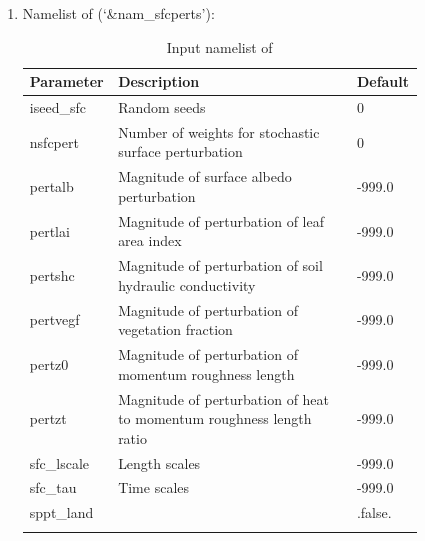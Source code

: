 \documentclass[11pt,fleqn]{report}              %
\begin{document}
\begin{enumerate}
\item Namelist of  (`\&nam\_sfcperts'):
{
\scriptsize
\begin{longtable}{p{0.1\linewidth} | p{0.6\linewidth} | p{0.12\linewidth} }
\hline
\hline
Parameter & Description & Default \\
\hline
iseed\_sfc & Random seeds & 0 \\
 nsfcpert & Number of weights for stochastic surface perturbation & 0 \\
 pertalb & Magnitude of surface albedo perturbation & -999.0 \\
 pertlai & Magnitude of perturbation of leaf area index & -999.0 \\
 pertshc & Magnitude of perturbation of soil hydraulic conductivity & -999.0 \\
 pertvegf & Magnitude of perturbation of vegetation fraction & -999.0 \\
 pertz0 & Magnitude of perturbation of momentum roughness length & -999.0 \\
 pertzt & Magnitude of perturbation of heat to momentum roughness length ratio & -999.0 \\
 sfc\_lscale & Length scales & -999.0 \\
 sfc\_tau & Time scales & -999.0 \\
 sppt\_land & & .false. \\
\hline
\caption{Input namelist of }
\label{table:fv3_input_nml_sfcperts}
\end{longtable}
}


\end{enumerate}
\end{document}
